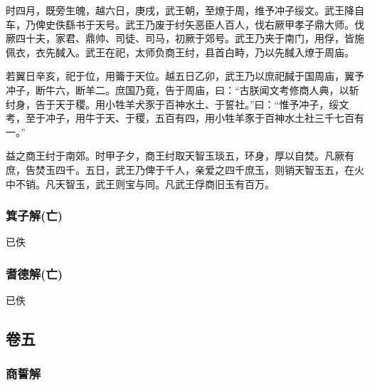 \documentclass[]{article}
\begin{document}
时四月，既旁生魄，越六日，庚戌，武王朝，至燎于周，维予冲子绥文。武王降自车，乃俾史佚繇书于天号。武王乃废于纣矢恶臣人百人，伐右厥甲孝子鼎大师。伐厥四十夫，家君、鼎帅、司徒、司马，初厥于郊号。武王乃夹于南门，用俘，皆施佩衣，衣先馘入。武王在祀，太师负商王纣，县首白畤，乃以先馘入燎于周庙。

若翼日辛亥，祀于位，用籥于天位。越五日乙卯，武王乃以庶祀馘于国周庙，翼予冲子，断牛六，断羊二。庶国乃竟，告于周庙，曰：``古朕闻文考修商人典，以斩纣身，告于天于稷。用小牲羊犬豕于百神水土、于誓社。''曰：``惟予冲子，绥文考，至于冲子，用牛于天、于稷，五百有四，用小牲羊豕于百神水土社三千七百有一。''

益之商王纣于南郊。时甲子夕，商王纣取天智玉琰五，环身，厚以自焚。凡厥有庶，告焚玉四千。五日，武王乃俾于千人，亲爱之四千庶玉，则销天智玉五，在火中不销。凡天智玉，武王则宝与同。凡武王俘商旧玉有百万。

\hypertarget{header-n219}{%
\subsubsection{箕子解(亡)}\label{header-n219}}

已佚

\hypertarget{header-n223}{%
\subsubsection{耆德解(亡)}\label{header-n223}}

已佚

\hypertarget{header-n231}{%
\subsection{卷五}\label{header-n231}}

\hypertarget{header-n235}{%
\subsubsection{商誓解}\label{header-n235}}
\end{document}
